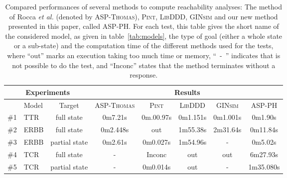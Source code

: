 \begin{table}[ht]
\begin{center}
\noindent%
\begin{tabular}{|l|l|c||c|c|c|c|c|}
\hline
  \multicolumn{3}{|c||}{Experiments} & \multicolumn{5}{c|}{Results} \\
\hline
  & Model & Target & \textsc{ASP-Thomas} & \textsc{Pint} & \textsc{LibDDD} & \textsc{GINsim} & \textsc{ASP-PH} \\
\hline
\hline
  \#1 & TTR & full state & 0m7.21s & 0m.00.97s & 0m1.151s &  0m1.001s & 0m1.90s \\
\hline
  \#2 & ERBB & full state & 0m2.448s & out &1m55.38s & 2m31.64s & 0m11.84s \\
\hline
  \#3 & ERBB & partial state & 0m2.61s & 0m0.027s &1m54.96s & - & 0m5.02s \\
\hline
  \#4 & TCR & full state & - & Inconc & out & out & 6m27.93s \\
\hline
  \#5 & TCR & partial state & - & 0m0.014s & out & - & 1m35.080s \\
\hline
\end{tabular}
\caption{\label{tab:reachability}%
Compared performances of several methods to compute reachability analyses:
The method of Rocca \textit{et al.} (denoted by \textsc{ASP-Thomas}), \textsc{Pint}, \textsc{LibDDD}, \textsc{GINsim} and our new method presented in this paper, called \textsc{ASP-PH}.
For each test, this table gives the short name of the considered model,
as given in table~\ref{tab:models},
the type of goal (either a whole state or a sub-state)
and the computation time of the different methods used for the tests,
where “out” marks an execution taking too much time or memory,
\mbox{“~-~”} indicates that is not possible to do the test,
and “Inconc” states that the method terminates without a response.
}
\end{center}
\end{table}

